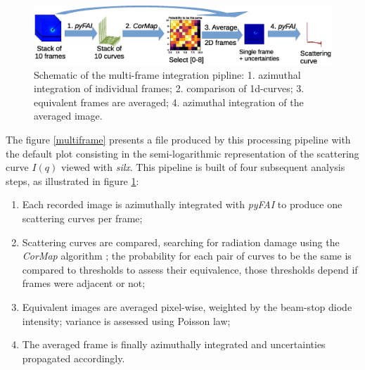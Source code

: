 \documentclass[preprint]{iucr}              %
\begin{document}
\begin{figure}
     \label{multiframe_worflow}
     \begin{center} 
     \caption{Schematic of the multi-frame integration pipline: 
     1. azimuthal integration of individual frames; 
     2. comparison of 1d-curves;
     3. equivalent frames are averaged;
     4. azimuthal integration of the averaged image.}
     \includegraphics*[width=12cm]{multiframe_pipeline.eps}
     \end{center}
\end{figure}

The figure \ref{multiframe} presents a file produced by this processing pipeline with the default plot consisting in the semi-logarithmic representation of the scattering curve $I(q)$ viewed with \textit{silx}.
This pipeline is built of four subsequent analysis steps, as illustrated in figure \ref{multiframe_worflow}:
\begin{enumerate}
\item Each recorded image is azimuthally integrated with \textit{pyFAI} \cite{pyfai_2020} to produce one scattering curves per frame;
\item Scattering curves are compared, searching for radiation damage using the \textit{CorMap} algorithm \cite{CorMap}; the probability for each pair of curves to be the same is compared to thresholds to assess their equivalence, those thresholds depend if frames were adjacent or not;
\item Equivalent images are averaged pixel-wise, weighted by the beam-stop diode intensity; variance is assessed using Poisson law;
\item The averaged frame is finally azimuthally integrated and uncertainties propagated accordingly. 
\end{enumerate}
\end{document}
